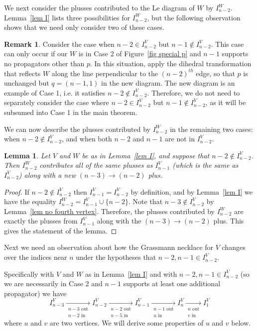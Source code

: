 \documentclass[11pt]{article}
\newtheorem{lem}[thm]{Lemma}
\theoremstyle{remark}
\theoremstyle{definition}
\newtheorem{rmk}[thm]{Remark}
\begin{document}
We next consider the plusses contributed to the Le diagram of $W$ by $I_{n-2}^W$. Lemma~\ref{lem I} lists three possibilities for $I_{n-2}^W$, but the following observation shows that we need only consider two of these cases.

\begin{rmk}\label{rem n-2 case} Consider the case when $n-2 \in I_{n-2}^V$ but $n-1 \not\in I_{n-2}^V$. This case can only occur if our $W$ is in Case 2 of Figure~\ref{fig special p} and $n-1$ supports no propagators other than $p$. In this situation, apply the dihedral transformation that reflects $W$ along the line perpendicular to the $(n-2)^{th}$ edge, so that $p$ is unchanged but $q = (n-1,1)$ in the new diagram. The new diagram is an example of Case 1, i.e. it satisfies $n-2 \not \in I_{n-2}^V$. Therefore, we do not need to separately consider the case where $n-2\in I_{n-2}^V$ but $n-1\not\in I_{n-2}^V$, as it will be subsumed into Case 1 in the main theorem.
\end{rmk}

We can now describe the plusses contributed by $I_{n-2}^W$ in the remaining two cases: when $n-2 \not\in I_{n-2}^V$, and when both $n-2$ and $n-1$ are not in $I_{n-2}^V$.

\begin{lem}\label{lem n-2 good}
  Let $V$ and $W$ be as in Lemma~\ref{lem I}, and suppose that $n-2 \not\in I_{n-2}^{V}$. Then $I_{n-2}^{W}$ contributes all of the same plusses as $I_{n-1}^{V}$ (which is the same as $I_{n-2}^{V}$) along with a new ${(n-3)\rightarrow (n-2)}$ plus.
\end{lem}


\begin{proof}
If $n-2\not\in I_{n-2}^{V}$ then $I_{n-1}^{V}=I_{n-2}^{V}$ by definition, and by Lemma~\ref{lem I} we have the equality ${I_{n-2}^{W} = I_{n-1}^{V} \cup \{n-2\}}$.  Note that $n-3\not\in I_{n-2}^{V}$ by Lemma~\ref{lem no fourth vertex}.  Therefore, the plusses contributed by $I_{n-2}^{W}$ are exactly the  plusses from $I_{n-1}^{V}$ along with the $(n-3)\rightarrow (n-2)$ plus.  This gives the statement of the lemma. 
\end{proof}

Next we need an observation about how the Grassmann necklace for $V$ changes over the indices near $n$ under the hypotheses that $n-2, n-1\in I_{n-2}^V$.

Specifically with $V$ and $W$ as in Lemma~\ref{lem I} and with $n-2, n-1\in I_{n-2}^V$ (so we are necessarily in Case 2 and $n-1$ supports at least one additional propagator) we have
  \begin{equation}\label{eq necklace}
  I_{n-3}^{V} \xrightarrow[\substack{n-3\text{ out}\\n-2\text{ in}}]{} I_{n-2}^{V} \xrightarrow[\substack{n-2\text{ out}\\n-5\text{ in}}]{} I_{n-1}^{V} \xrightarrow[\substack{n-1\text{ out}\\ u \text{ in}}]{} I_{n}^{V}  \xrightarrow[\substack{n \text{ out}\\v \text{ in}}]{} I_1^{V}
  \end{equation}
where $u$ and $v$ are two vertices. We will derive some properties of $u$ and $v$ below.
\end{document}
